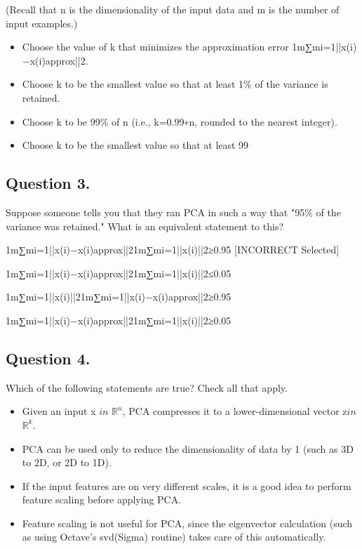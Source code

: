 (Recall that n is the dimensionality of the input data and m is the number of input examples.)

\begin{itemize}
\item Choose the value of k that minimizes the approximation error 1m∑mi=1||x(i)−x(i)approx||2.

\item Choose k to be the smallest value so that at least 1\% of the variance is retained.

\item Choose k to be 99\% of n (i.e., k=0.99∗n, rounded to the nearest integer).

\item Choose k to be the smallest value so that at least 99%

\end{itemize}
\subsection{ Question 3. }
Suppose someone tells you that they ran PCA in such a way that "95\% of the variance was retained." What is an equivalent statement to this?

1m∑mi=1||x(i)−x(i)approx||21m∑mi=1||x(i)||2≥0.95 [INCORRECT Selected]

1m∑mi=1||x(i)−x(i)approx||21m∑mi=1||x(i)||2≤0.05

1m∑mi=1||x(i)||21m∑mi=1||x(i)−x(i)approx||2≥0.95

1m∑mi=1||x(i)−x(i)approx||21m∑mi=1||x(i)||2≥0.05

\subsection{ Question 4. }
Which of the following statements are true? Check all that apply.

\begin{itemize}
\item Given an input x $in$ $\mathbb{R}^n$, PCA compresses it to a lower-dimensional vector z$in$ $\mathbb{R}^k$.

\item PCA can be used only to reduce the dimensionality of data by 1 (such as 3D to 2D, or 2D to 1D).

\item If the input features are on very different scales, it is a good idea to perform feature scaling before applying PCA.

\item Feature scaling is not useful for PCA, since the eigenvector calculation (such as using Octave's svd(Sigma) routine) takes care of this automatically.
\end{itemize}
